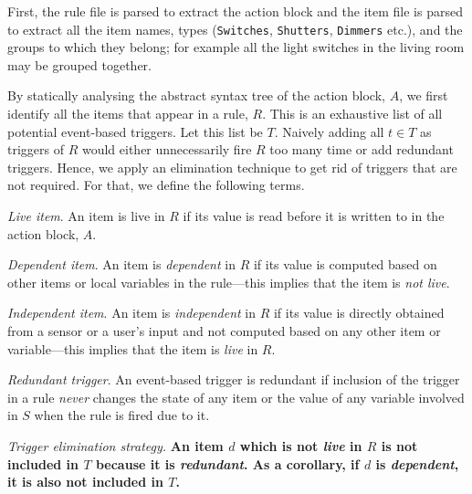 \documentclass{sig-alternate-05-2015}
\begin{document}
First, the rule file is parsed to extract the action block and the item file is parsed to extract all the item names, types (\texttt{Switches}, \texttt{Shutters}, \texttt{Dimmers} etc.), and the groups to which they belong; for example all the light switches in the living room may be grouped together.

By statically analysing the abstract syntax tree of the action block, $A$, we first identify all the items that appear in a rule, $R$. This is an exhaustive list of all potential event-based triggers. Let this list be $T$.
Naively adding all $t \in T$ as triggers of $R$ would either unnecessarily fire $R$ too many time or add redundant triggers. Hence, we apply an elimination technique to get rid of triggers that are not required. For that, we define the following terms.

\emph{Live item}. An item is live in $R$ if its value is read before it is written to in the action block, $A$. 

\emph{Dependent item}. An item is \emph{dependent} in $R$ if its value is computed based on other items or local variables in the rule---this implies that the item is \emph{not live}. 
 
\emph{Independent item}. An item is \emph{independent} in $R$ if  its value is directly obtained from a sensor or a user's input and not computed based on any other item or variable---this implies that the item is \emph{live} in $R$. 

\emph{Redundant trigger}. An event-based trigger is redundant if inclusion of the trigger in a rule \emph{never} changes the state of any item or the value of any variable involved in $S$ when the rule is fired due to it.

\emph{Trigger elimination strategy.} \textbf{ An item $d$ which is not \emph{live} in $R$ is not included in $T$ because it is \emph{redundant}. As a corollary, if $d$ is \emph{dependent}, it is also not included in $T$.} 
\end{document}
